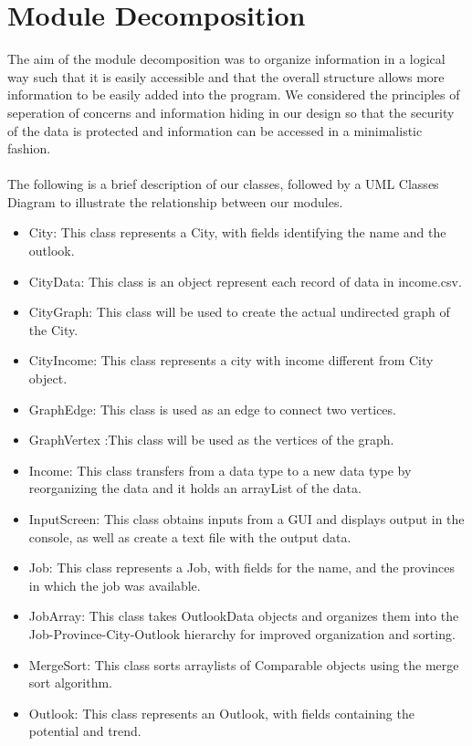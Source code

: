 \documentclass[12pt,fleqn]{article}
\begin{document}
\section*{Module Decomposition}
The aim of the module decomposition was to organize information in a logical way such that it is easily accessible and that the overall structure allows more information to be easily added into the program. We considered the principles of seperation of concerns and information hiding in our design so that the security of the data is protected and information can be accessed in a minimalistic fashion.
\\\\
The following is a brief description of our classes, followed by a UML Classes Diagram to illustrate the relationship between our modules.
\begin{itemize}
\item City: This class represents a City, with fields identifying the name and the outlook.
\item CityData: This class is an object represent each record of data in income.csv.
\item CityGraph: This class will be used to create the actual undirected graph of the City.
\item CityIncome: This class represents a city with income different from City object.
\item GraphEdge: This class is used as an edge to connect two vertices.
\item GraphVertex :This class will be used as the vertices of the graph.
\item Income: This class transfers from a data type to a new data type by reorganizing the data and it holds an arrayList of the data. 
\item InputScreen: This class obtains inputs from a GUI and displays output in the console, as well as create a text file with the output data.
\item Job: This class represents a Job, with fields for the name, and the provinces in which the job was available.
\item JobArray: This class takes OutlookData objects and organizes them into the Job-Province-City-Outlook hierarchy for improved organization and sorting.
\item MergeSort: This class sorts arraylists of Comparable objects using the merge sort algorithm.
\item Outlook: This class represents an Outlook, with fields containing the potential and trend.

\end{itemize}
\end{document}
